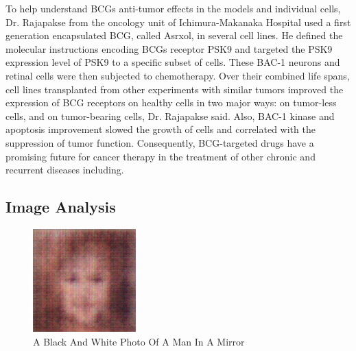\documentclass{article}%
\begin{document}
To help understand BCGs anti{-}tumor effects in the models and individual cells, Dr. Rajapakse from the oncology unit of Ichimura{-}Makanaka Hospital used a first generation encapsulated BCG, called Asrxol, in several cell lines. He defined the molecular instructions encoding BCGs receptor PSK9 and targeted the PSK9 expression level of PSK9 to a specific subset of cells. These BAC{-}1 neurons and retinal cells were then subjected to chemotherapy.\newline%
Over their combined life spans, cell lines transplanted from other experiments with similar tumors improved the expression of BCG receptors on healthy cells in two major ways: on tumor{-}less cells, and on tumor{-}bearing cells, Dr. Rajapakse said. Also, BAC{-}1 kinase and apoptosis improvement slowed the growth of cells and correlated with the suppression of tumor function. Consequently, BCG{-}targeted drugs have a promising future for cancer therapy in the treatment of other chronic and recurrent diseases including.

%
\subsection{Image Analysis}%
\label{subsec:ImageAnalysis}%


\begin{figure}[h!]%
\centering%
\includegraphics[width=150px]{500_fake_images/samples_5_400.png}%
\caption{A Black And White Photo Of A Man In A Mirror}%
\end{figure}

%
\end{document}

